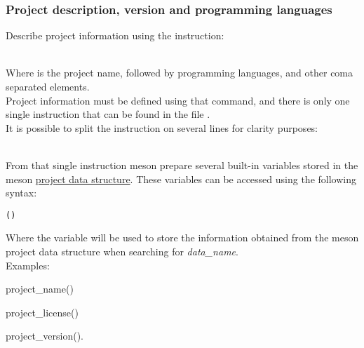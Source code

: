 \subsubsection*{Project description, version and programming languages}
\label{meson_proj}
Describe project information using the  instruction:
{\footnotesize{
\begin{script}
\end{script} 
}}
\\[-0.5cm]
\noindent Where  is the project name, followed by programming languages, and other coma separated elements. \\[0.25cm]
Project information must be defined using that command, and there is only one single  instruction that can be found in the file . \\[0.25cm]
It is possible to split the instruction on several lines for clarity purposes: 
{\footnotesize{
\begin{script}
\end{script} 
}}
\\[-0.5cm]
\noindent From that single instruction meson prepare several built-in variables stored in the meson \href{https://mesonbuild.com/Reference-manual\_functions.html#project}{project data structure}. 
\newpage
\noindent These variables can be accessed using the following syntax:
\begin{center} \texttt{()}\end{center}
\noindent Where the variable  will be used to store the information obtained from the meson project data structure when searching for {\em{data\_name}}. \\[0.25cm]
Examples: 
\vspace{-0.25cm}
{\footnotesize{
\begin{script}
project\_name()

project\_license()

project\_version().
\end{script} 
}}
